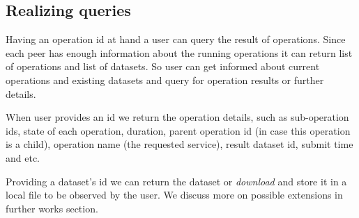 \subsection{Realizing queries}
Having an operation id at hand a user can query the result of operations. 
Since each peer has enough information about the running operations it can return list of operations and list of datasets.
So user can get informed about current operations and existing datasets and query for operation results or further details.

When user provides an id we return the operation details, such as sub-operation ids, state of each operation,
duration, parent operation id (in case this operation is a child), operation name (the requested service), 
result dataset id, submit time and etc.

Providing a dataset's id we can return the dataset or \textit{download} and store it in a local file to be observed by the user.
We discuss more on possible extensions in further works section.
